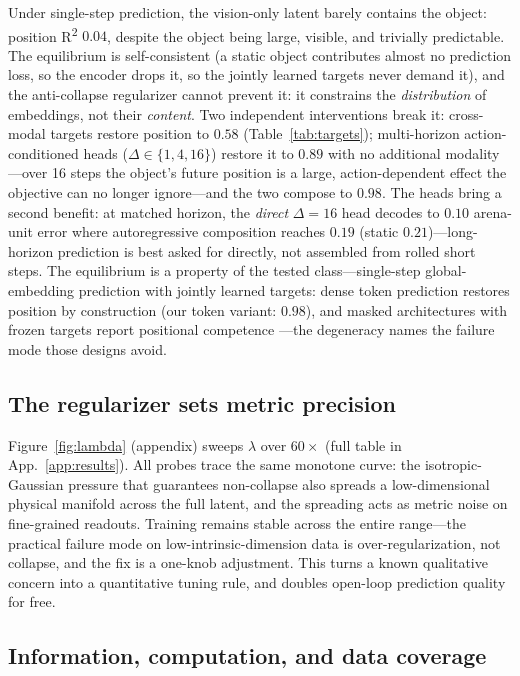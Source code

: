 \documentclass{article} %
\begin{document}
Under single-step prediction, the vision-only latent barely contains the
object: position R\textsuperscript{2} $0.04$, despite the object being large,
visible, and trivially predictable. The equilibrium is self-consistent (a
static object contributes almost no prediction loss, so the encoder drops it,
so the jointly learned targets never demand it), and the anti-collapse
regularizer cannot prevent it: it constrains the \emph{distribution} of
embeddings, not their \emph{content}. Two independent interventions break
it: cross-modal targets restore position to $0.58$
(Table~\ref{tab:targets}); multi-horizon action-conditioned heads
($\Delta \in \{1,4,16\}$) restore it to $0.89$ with no additional
modality---over 16 steps the object's future position is a large,
action-dependent effect the objective can no longer ignore---and the two
compose to $0.98$. The heads bring a second benefit: at matched horizon, the
\emph{direct} $\Delta{=}16$ head decodes to $0.10$ arena-unit error where
autoregressive composition reaches $0.19$ (static $0.21$)---long-horizon
prediction is best asked for directly, not assembled from rolled short steps.
The equilibrium is a property of the tested class---single-step
global-embedding prediction with jointly learned targets: dense token
prediction restores position by construction (our token variant: $0.98$),
and masked architectures with frozen targets report positional competence
\citep{garrido2025intuitive}---the degeneracy names the failure mode those
designs avoid.

\subsection{The regularizer sets metric precision}
\label{sec:lambda}

Figure~\ref{fig:lambda} (appendix) sweeps $\lambda$ over $60\times$ (full
table in App.~\ref{app:results}). All probes trace the same monotone curve:
the isotropic-Gaussian pressure that guarantees non-collapse also spreads a
low-dimensional physical manifold across the full latent, and the spreading
acts as metric noise on fine-grained readouts. Training remains stable across
the entire range---the practical failure mode on low-intrinsic-dimension data
is over-regularization, not collapse, and the fix is a one-knob adjustment.
This turns a known qualitative concern \citep{maes2026lewm} into a
quantitative tuning rule, and doubles open-loop prediction quality for free.

\subsection{Information, computation, and data coverage}
\label{sec:threefactors}
\end{document}
